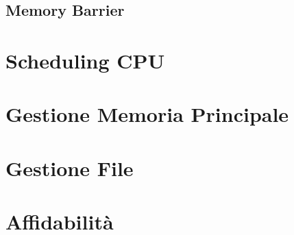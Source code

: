 \documentclass[a4paper]{article}
\begin{document}
\subsection{Memory Barrier}
\newpage
\section{Scheduling CPU}
\newpage
\section{Gestione Memoria Principale}
\newpage
\section{Gestione File}
\newpage
\section{Affidabilità}
\end{document}
